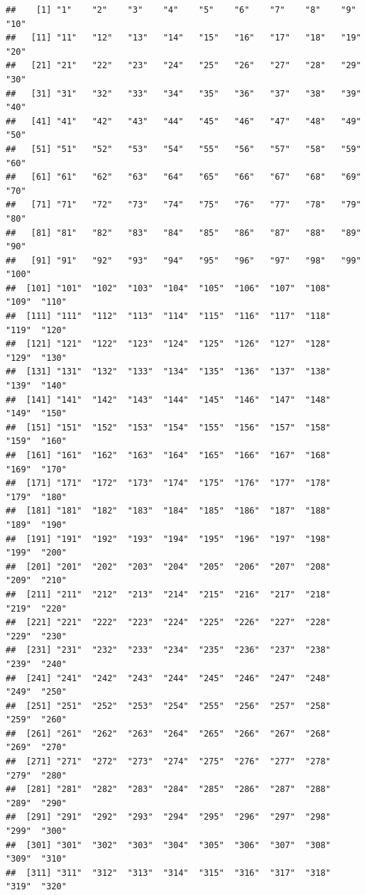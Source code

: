 \documentclass[]{book}
\begin{document}
\begin{verbatim}
##    [1] "1"    "2"    "3"    "4"    "5"    "6"    "7"    "8"    "9"    "10"  
##   [11] "11"   "12"   "13"   "14"   "15"   "16"   "17"   "18"   "19"   "20"  
##   [21] "21"   "22"   "23"   "24"   "25"   "26"   "27"   "28"   "29"   "30"  
##   [31] "31"   "32"   "33"   "34"   "35"   "36"   "37"   "38"   "39"   "40"  
##   [41] "41"   "42"   "43"   "44"   "45"   "46"   "47"   "48"   "49"   "50"  
##   [51] "51"   "52"   "53"   "54"   "55"   "56"   "57"   "58"   "59"   "60"  
##   [61] "61"   "62"   "63"   "64"   "65"   "66"   "67"   "68"   "69"   "70"  
##   [71] "71"   "72"   "73"   "74"   "75"   "76"   "77"   "78"   "79"   "80"  
##   [81] "81"   "82"   "83"   "84"   "85"   "86"   "87"   "88"   "89"   "90"  
##   [91] "91"   "92"   "93"   "94"   "95"   "96"   "97"   "98"   "99"   "100" 
##  [101] "101"  "102"  "103"  "104"  "105"  "106"  "107"  "108"  "109"  "110" 
##  [111] "111"  "112"  "113"  "114"  "115"  "116"  "117"  "118"  "119"  "120" 
##  [121] "121"  "122"  "123"  "124"  "125"  "126"  "127"  "128"  "129"  "130" 
##  [131] "131"  "132"  "133"  "134"  "135"  "136"  "137"  "138"  "139"  "140" 
##  [141] "141"  "142"  "143"  "144"  "145"  "146"  "147"  "148"  "149"  "150" 
##  [151] "151"  "152"  "153"  "154"  "155"  "156"  "157"  "158"  "159"  "160" 
##  [161] "161"  "162"  "163"  "164"  "165"  "166"  "167"  "168"  "169"  "170" 
##  [171] "171"  "172"  "173"  "174"  "175"  "176"  "177"  "178"  "179"  "180" 
##  [181] "181"  "182"  "183"  "184"  "185"  "186"  "187"  "188"  "189"  "190" 
##  [191] "191"  "192"  "193"  "194"  "195"  "196"  "197"  "198"  "199"  "200" 
##  [201] "201"  "202"  "203"  "204"  "205"  "206"  "207"  "208"  "209"  "210" 
##  [211] "211"  "212"  "213"  "214"  "215"  "216"  "217"  "218"  "219"  "220" 
##  [221] "221"  "222"  "223"  "224"  "225"  "226"  "227"  "228"  "229"  "230" 
##  [231] "231"  "232"  "233"  "234"  "235"  "236"  "237"  "238"  "239"  "240" 
##  [241] "241"  "242"  "243"  "244"  "245"  "246"  "247"  "248"  "249"  "250" 
##  [251] "251"  "252"  "253"  "254"  "255"  "256"  "257"  "258"  "259"  "260" 
##  [261] "261"  "262"  "263"  "264"  "265"  "266"  "267"  "268"  "269"  "270" 
##  [271] "271"  "272"  "273"  "274"  "275"  "276"  "277"  "278"  "279"  "280" 
##  [281] "281"  "282"  "283"  "284"  "285"  "286"  "287"  "288"  "289"  "290" 
##  [291] "291"  "292"  "293"  "294"  "295"  "296"  "297"  "298"  "299"  "300" 
##  [301] "301"  "302"  "303"  "304"  "305"  "306"  "307"  "308"  "309"  "310" 
##  [311] "311"  "312"  "313"  "314"  "315"  "316"  "317"  "318"  "319"  "320" 

\end{verbatim}
\end{document}
